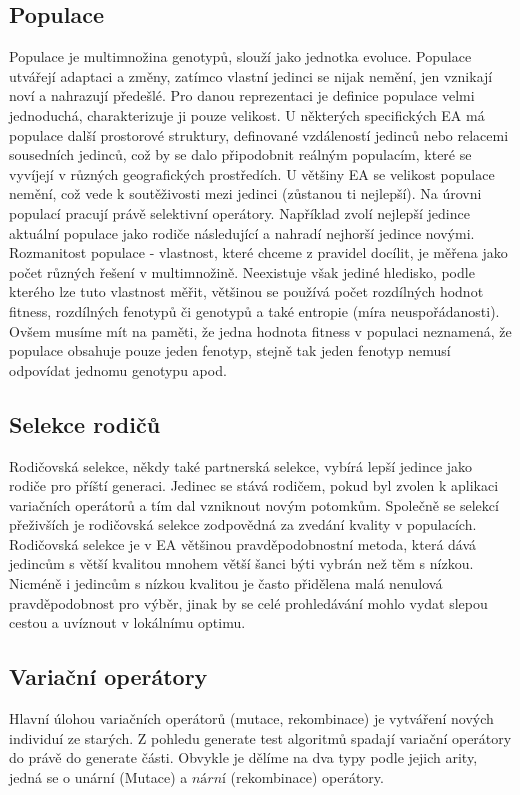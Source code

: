 \subsection*{Populace}
Populace je multimnožina genotypů, slouží jako jednotka evoluce. Populace utvářejí adaptaci a změny, zatímco vlastní jedinci se nijak nemění, jen vznikají noví a nahrazují předešlé. Pro danou reprezentaci je definice populace velmi jednoduchá, charakterizuje ji pouze velikost. U některých specifických EA má populace další prostorové struktury, definované vzdáleností jedinců nebo relacemi sousedních jedinců, což by se dalo připodobnit reálným populacím, které se vyvíjejí v různých geografických prostředích. U většiny EA se velikost populace nemění, což vede k soutěživosti mezi jedinci (zůstanou ti nejlepší). Na úrovni populací pracují právě selektivní operátory. Například zvolí nejlepší jedince aktuální populace jako rodiče následující a nahradí nejhorší jedince novými. Rozmanitost populace - vlastnost, které chceme z pravidel docílit, je měřena jako počet různých řešení v multimnožině. Neexistuje však jediné hledisko, podle kterého lze tuto vlastnost měřit, většinou se používá počet rozdílných hodnot fitness, rozdílných fenotypů či genotypů a také entropie (míra neuspořádanosti). Ovšem musíme mít na paměti, že jedna hodnota fitness v populaci neznamená, že populace obsahuje pouze jeden fenotyp, stejně tak jeden fenotyp nemusí odpovídat jednomu genotypu apod. 
\subsection*{Selekce rodičů}
Rodičovská selekce, někdy také partnerská selekce, vybírá lepší jedince jako rodiče pro příští generaci. Jedinec se stává rodičem, pokud byl zvolen k aplikaci variačních operátorů a tím dal vzniknout novým potomkům. Společně se selekcí přeživších je rodičovská selekce zodpovědná za zvedání kvality v populacích. Rodičovská selekce je v EA většinou pravděpodobnostní metoda, která dává jedincům s větší kvalitou mnohem větší šanci býti vybrán než těm s nízkou. Nicméně i jedincům s nízkou kvalitou je často přidělena malá nenulová pravděpodobnost pro výběr, jinak by se celé prohledávání mohlo vydat slepou cestou a uvíznout v lokálnímu optimu. 
\subsection*{Variační operátory}
Hlavní úlohou variačních operátorů (mutace, rekombinace) je vytváření nových individuí ze starých. Z pohledu generate  test algoritmů spadají variační operátory do právě do generate části. Obvykle je dělíme na dva typy podle jejich arity, jedná se o unární (Mutace) a $nární$ (rekombinace) operátory.
